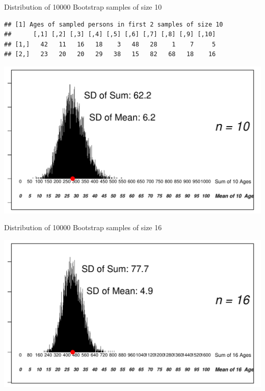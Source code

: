\documentclass[10pt]{beamer}\usepackage[]{graphicx}\usepackage[]{color}
\makeatletter
\def\maxwidth{ %
  \ifdim\Gin@nat@width>\linewidth
    \linewidth
  \else
    \Gin@nat@width
  \fi
}
\newenvironment{kframe}{%
 \def\at@end@of@kframe{}%
 \ifinner\ifhmode%
  \def\at@end@of@kframe{\end{minipage}}%
  \begin{minipage}{\columnwidth}%
 \fi\fi%
 \def\FrameCommand##1{\hskip\@totalleftmargin \hskip-\fboxsep
 \colorbox{shadecolor}{##1}\hskip-\fboxsep
     \hskip-\linewidth \hskip-\@totalleftmargin \hskip\columnwidth}%
 \MakeFramed {\advance\hsize-\width
   \@totalleftmargin\z@ \linewidth\hsize
   \@setminipage}}%
 {\par\unskip\endMakeFramed%
 \at@end@of@kframe}
\newenvironment{knitrout}{}{} %
\makeatother
\begin{document}
\begin{frame}[fragile]{Distribution of 10000 Bootstrap samples of size 10}
\begin{knitrout}\tiny
{}\color{fgcolor}\begin{kframe}
\begin{verbatim}
## [1] Ages of sampled persons in first 2 samples of size 10
##      [,1] [,2] [,3] [,4] [,5] [,6] [,7] [,8] [,9] [,10]
## [1,]   42   11   16   18    3   48   28    1    7     5
## [2,]   23   20   20   29   38   15   82   68   18    16
\end{verbatim}
\end{kframe}

{\centering \includegraphics[width=\maxwidth]{figure/unnamed-chunk-4-1} 

}


\end{knitrout}
	
\end{frame}




\begin{frame}[fragile]{Distribution of 10000 Bootstrap samples of size 16}
\begin{knitrout}\tiny
{}\color{fgcolor}

{\centering \includegraphics[width=\maxwidth]{figure/unnamed-chunk-5-1} 

}


\end{knitrout}
	
\end{frame}
\end{document}
